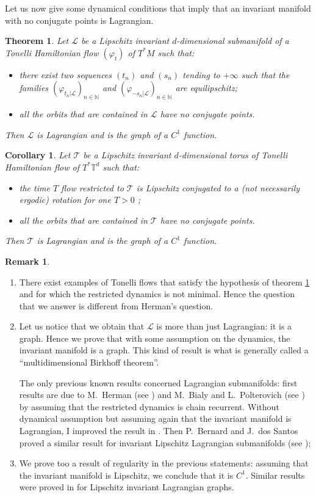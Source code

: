 \documentclass{dcds}
\newtheorem{theorem}{Theorem}[section]
\newtheorem{corollary}{Corollary}
\theoremstyle{definition}
\newtheorem{remark}{Remark}
\begin{document}
  Let us now give some dynamical conditions that imply that an invariant manifold with no conjugate points  is Lagrangian.
\begin{theorem}\label{T1}  Let ${\mathcal {L}}$ be a  Lipschitz  invariant $d$-dimensional submanifold of a Tonelli Hamiltonian flow   $(\varphi_t)$ of $T^*M$ such that: \begin{itemize}
\item  there exist two sequences $(t_n)$ and $(s_n)$  tending to $+\infty$ such that the families $(\varphi_{t_n|{\mathcal {L}}})_{n\in{\mathbb {N}}}$ and $(\varphi_{-s_n|{\mathcal {L}}})_{n\in{\mathbb {N}}}$ are equilipschitz;
\item all the orbits that are contained in ${\mathcal {L}}$ have no conjugate points.
\end{itemize}
Then ${\mathcal {L}}$ is Lagrangian and is the graph of a $C^1$ function.
\end{theorem}
 \begin{corollary}\label{C1}
  Let ${\mathcal {T}}$ be a  Lipschitz  invariant $d$-dimensional torus of Tonelli Hamiltonian flow   of $T^*{\mathbb {T}}^d$ such that: \begin{itemize}
\item  the time $T$ flow restricted to ${\mathcal {T}}$ is Lipschitz conjugated to a (not necessarily ergodic) rotation for one $T>0$ ;
\item all the orbits that are contained in ${\mathcal {T}}$ have no conjugate points.
\end{itemize}
Then ${\mathcal {T}}$ is Lagrangian and is the graph of a $C^1$ function.
 \end{corollary}
\begin{remark}\begin{enumerate}
\item There exist examples of Tonelli flows that satisfy the hypothesis of theorem \ref{T1} and for which the restricted dynamics is not minimal. Hence the question that we answer is different from Herman's question.
 \item Let us notice that we obtain that ${\mathcal {L}}$ is more than just Lagrangian: it is a graph. Hence we prove that with some assumption on the dynamics, the invariant manifold is a graph. This kind of result is what is generally called a ``multidimensional Birkhoff theorem''. 

The only previous known results concerned Lagrangian submanifolds:  first results  are due to M.~Herman (see \cite{He1}) and M.~Bialy and L.~Polterovich (see \cite{Bia1, BiaPol1, BiaPol2, BiaPol3}) by assuming that the restricted dynamics is chain recurrent. Without dynamical assumption but assuming again  that    the  invariant manifold is Lagrangian, I improved the result in \cite{Ar2}. Then P.~Bernard and J.~dos Santos proved a similar result for invariant Lipschitz Lagrangian submanifolds (see \cite{BeSa});
\item We prove too a result of regularity in the previous statements: assuming that the invariant manifold is Lipschitz, we conclude that it is $C^1$. Similar results were proved in \cite{Ar1} for Lipschitz invariant Lagrangian graphs.
\end{enumerate}
 \end{remark}
\end{document}
